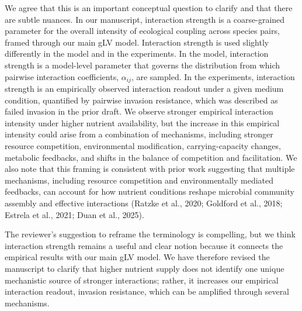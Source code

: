 \responselabel
We agree that this is an important conceptual question to clarify and that there are subtle nuances. In our manuscript, interaction strength is a coarse-grained parameter for the overall intensity of ecological coupling across species pairs, framed through our main gLV model. Interaction strength is used slightly differently in the model and in the experiments. In the model, interaction strength is a model-level parameter that governs the distribution from which pairwise interaction coefficients, $\alpha_{ij}$, are sampled. In the experiments, interaction strength is an empirically observed interaction readout under a given medium condition, quantified by pairwise invasion resistance, which was described as failed invasion in the prior draft. We observe stronger empirical interaction intensity under higher nutrient availability, but the increase in this empirical intensity could arise from a combination of mechanisms, including stronger resource competition, environmental modification, carrying-capacity changes, metabolic feedbacks, and shifts in the balance of competition and facilitation. We also note that this framing is consistent with prior work suggesting that multiple mechanisms, including resource competition and environmentally mediated feedbacks, can account for how nutrient conditions reshape microbial community assembly and effective interactions (Ratzke et al., 2020; Goldford et al., 2018; Estrela et al., 2021; Duan et al., 2025).

The reviewer's suggestion to reframe the terminology is compelling, but we think interaction strength remains a useful and clear notion because it connects the empirical results with our main gLV model. We have therefore revised the manuscript to clarify that higher nutrient supply does not identify one unique mechanistic source of stronger interactions; rather, it increases our empirical interaction readout, invasion resistance, which can be amplified through several mechanisms.


